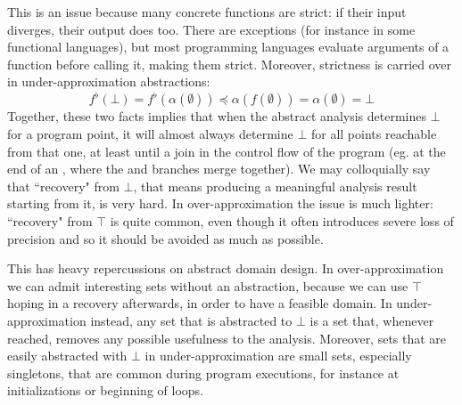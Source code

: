 This is an issue because many concrete functions are strict: if their input diverges, their output does too. There are exceptions (for instance in some functional languages), but most programming languages evaluate arguments of a function before calling it, making them strict. Moreover, strictness is carried over in under-approximation abstractions:
\[
f^{\flat}(\bot) = f^{\flat}(\alpha(\emptyset)) \preceq \alpha(f(\emptyset)) = \alpha(\emptyset) = \bot
\]
Together, these two facts implies that when the abstract analysis determines $\bot$ for a program point, it will almost always determine $\bot$ for all points reachable from that one, at least until a join in the control flow of the program (eg. at the end of an , where the  and  branches merge together). We may colloquially say that ``recovery" from $\bot$, that means producing a meaningful analysis result starting from it, is very hard.
In over-approximation the issue is much lighter: ``recovery" from $\top$ is quite common, even though it often introduces severe loss of precision and so it should be avoided as much as possible.

This has heavy repercussions on abstract domain design. In over-approximation we can admit interesting sets without an abstraction, because we can use $\top$ hoping in a recovery afterwards, in order to have a feasible domain. In under-approximation instead, any set that is abstracted to $\bot$ is a set that, whenever reached, removes any possible usefulness to the analysis.
Moreover, sets that are easily abstracted with $\bot$ in under-approximation are small sets, especially singletons, that are common during program executions, for instance at initializations or beginning of loops.

